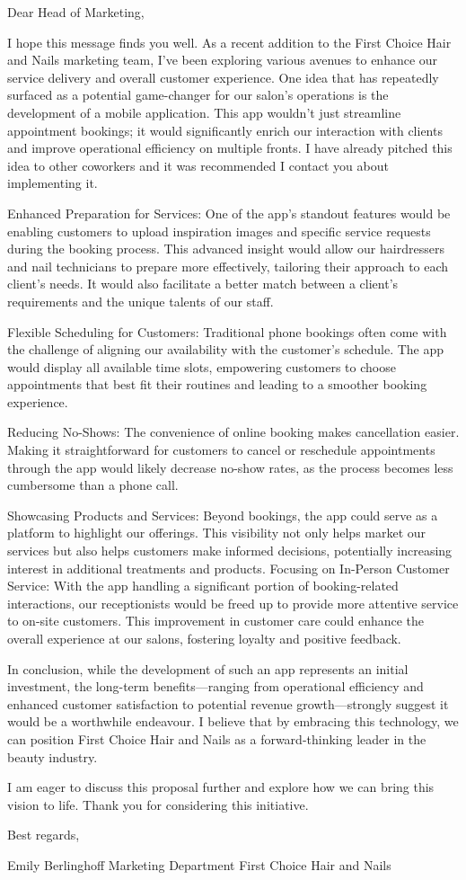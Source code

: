 \documentclass[12pt]{article}
\begin{document}
Dear Head of Marketing,

I hope this message finds you well. As a recent addition to the First Choice Hair and Nails marketing team, I've been exploring various avenues to enhance our service delivery and overall customer experience. One idea that has repeatedly surfaced as a potential game-changer for our salon’s operations is the development of a mobile application. This app wouldn't just streamline appointment bookings; it would significantly enrich our interaction with clients and improve operational efficiency on multiple fronts. I have already pitched this idea to other coworkers and it was recommended I contact you about implementing it.

Enhanced Preparation for Services: One of the app's standout features would be enabling customers to upload inspiration images and specific service requests during the booking process. This advanced insight would allow our hairdressers and nail technicians to prepare more effectively, tailoring their approach to each client's needs. It would also facilitate a better match between a client's requirements and the unique talents of our staff.

Flexible Scheduling for Customers: Traditional phone bookings often come with the challenge of aligning our availability with the customer's schedule. The app would display all available time slots, empowering customers to choose appointments that best fit their routines and leading to a smoother booking experience.

Reducing No-Shows: The convenience of online booking makes cancellation easier. Making it straightforward for customers to cancel or reschedule appointments through the app would likely decrease no-show rates, as the process becomes less cumbersome than a phone call.

Showcasing Products and Services: Beyond bookings, the app could serve as a platform to highlight our offerings. This visibility not only helps market our services but also helps customers make informed decisions, potentially increasing interest in additional treatments and products.
Focusing on In-Person Customer Service: With the app handling a significant portion of booking-related interactions, our receptionists would be freed up to provide more attentive service to on-site customers. This improvement in customer care could enhance the overall experience at our salons, fostering loyalty and positive feedback.

In conclusion, while the development of such an app represents an initial investment, the long-term benefits—ranging from operational efficiency and enhanced customer satisfaction to potential revenue growth—strongly suggest it would be a worthwhile endeavour. I believe that by embracing this technology, we can position First Choice Hair and Nails as a forward-thinking leader in the beauty industry.

I am eager to discuss this proposal further and explore how we can bring this vision to life. Thank you for considering this initiative.

Best regards,

Emily Berlinghoff
Marketing Department
First Choice Hair and Nails
\end{document}
